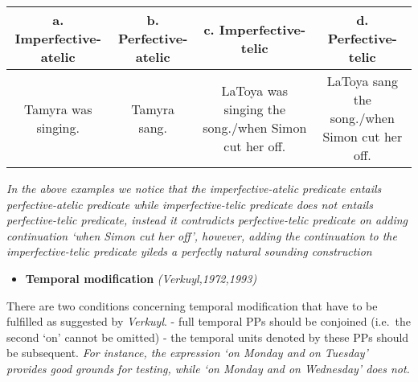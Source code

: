 \documentclass[11pt]{article}
\providecommand{\tightlist}{%
      \setlength{\itemsep}{0pt}\setlength{\parskip}{0pt}}
\begin{document}
\begin{longtable}[]{@{}cccc@{}}
\toprule
\begin{minipage}[b]{0.24\columnwidth}\centering
a. Imperfective-atelic\strut
\end{minipage} & \begin{minipage}[b]{0.23\columnwidth}\centering
b. Perfective-atelic\strut
\end{minipage} & \begin{minipage}[b]{0.22\columnwidth}\centering
c. Imperfective-telic\strut
\end{minipage} & \begin{minipage}[b]{0.20\columnwidth}\centering
d. Perfective-telic\strut
\end{minipage}\tabularnewline
\midrule
\endhead
\begin{minipage}[t]{0.24\columnwidth}\centering
Tamyra was singing.\strut
\end{minipage} & \begin{minipage}[t]{0.23\columnwidth}\centering
Tamyra sang.\strut
\end{minipage} & \begin{minipage}[t]{0.22\columnwidth}\centering
LaToya was singing the song./when Simon cut her off.\strut
\end{minipage} & \begin{minipage}[t]{0.20\columnwidth}\centering
LaToya sang the song./when Simon cut her off.\strut
\end{minipage}\tabularnewline
\bottomrule
\end{longtable}

\emph{In the above examples we notice that the imperfective-atelic
predicate entails perfective-atelic predicate while imperfective-telic
predicate does not entails perfective-telic predicate, instead it
contradicts perfective-telic predicate on adding continuation `when
Simon cut her off', however, adding the continuation to the
imperfective-telic predicate yileds a perfectly natural sounding
construction}

    \begin{itemize}
\tightlist
\item
  \textbf{Temporal modification} \emph{(Verkuyl,1972,1993)}
\end{itemize}

There are two conditions concerning temporal modification that have to
be fulfilled as suggested by \emph{Verkuyl}. - full temporal PPs should
be conjoined (i.e.~the second `on' cannot be omitted) - the temporal
units denoted by these PPs should be subsequent. \emph{For instance, the
expression `on Monday and on Tuesday' provides good grounds for testing,
while `on Monday and on Wednesday' does not.}
\end{document}
